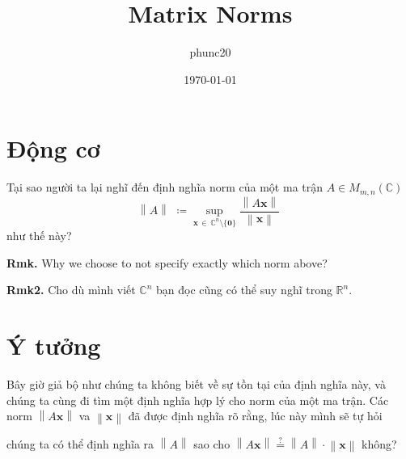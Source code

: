 \documentclass{article}
\title{Matrix Norms}
\author{phunc20}
\date{\today}
\newcommand{\norm}[1]{\left\lVert#1\right\rVert}
\begin{document}
\theoremstyle{definition}
\newtheorem{Spiel}{Vd}[section]


\maketitle
\section{Động cơ}
Tại sao người ta lại nghĩ đến định nghĩa norm của một ma trận $A \in M_{m,n}(\mathbb{C})$
$$\norm{A} \,\,\coloneqq\!\! \sup_{\mathbf{x} \,\in\, {\mathbb{C}^{n} \setminus \{\mathbf{0}\}}} \frac{\norm{A\mathbf{x}}}{\norm{\mathbf{x}}}\;$$
như thế này?

\textbf{Rmk.} Why we choose to not specify exactly which norm above?

\textbf{Rmk2.} Cho dù mình viết $\mathbb{C}^n$ bạn đọc cũng có thể suy nghĩ trong $\mathbb{R}^n$.

\section{Ý tưởng}
Bây giờ giả bộ như chúng ta không biết về sự tồn tại của định nghĩa này, và chúng ta cùng đi tìm một định nghĩa hợp lý
cho norm của một ma trận. Các norm $\norm{A\mathbf{x}}$ va $\norm{\mathbf{x}}$ đã được định nghĩa rõ rằng, lúc này  mình sẽ tự hỏi
\begin{displayquote}
chúng ta có thể định nghĩa ra $\norm{A}$ sao cho $\norm{A\mathbf{x}} \stackrel{?}{=} \norm{A}\cdot\norm{\mathbf{x}}$ không?
\end{displayquote}
\end{document}
